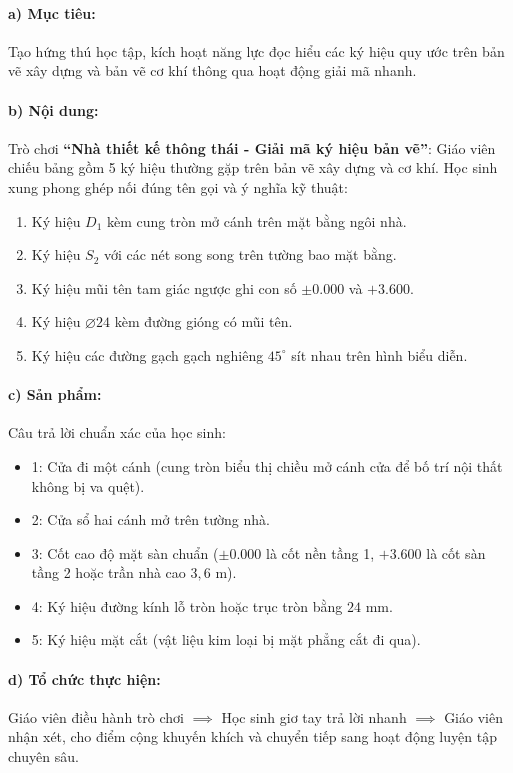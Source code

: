\documentclass[12pt, a4paper]{article}
\begin{document}
\paragraph{a) Mục tiêu:} Tạo hứng thú học tập, kích hoạt năng lực đọc hiểu các ký hiệu quy ước trên bản vẽ xây dựng và bản vẽ cơ khí thông qua hoạt động giải mã nhanh.

\paragraph{b) Nội dung:} Trò chơi \textbf{``Nhà thiết kế thông thái - Giải mã ký hiệu bản vẽ''}: Giáo viên chiếu bảng gồm 5 ký hiệu thường gặp trên bản vẽ xây dựng và cơ khí. Học sinh xung phong ghép nối đúng tên gọi và ý nghĩa kỹ thuật:
\begin{enumerate}[leftmargin=0.6cm]
    \item Ký hiệu $D_1$ kèm cung tròn mở cánh trên mặt bằng ngôi nhà.
    \item Ký hiệu $S_2$ với các nét song song trên tường bao mặt bằng.
    \item Ký hiệu mũi tên tam giác ngược ghi con số $\pm 0.000$ và $+3.600$.
    \item Ký hiệu $\varnothing 24$ kèm đường gióng có mũi tên.
    \item Ký hiệu các đường gạch gạch nghiêng $45^\circ$ sít nhau trên hình biểu diễn.
\end{enumerate}

\paragraph{c) Sản phẩm:} Câu trả lời chuẩn xác của học sinh:
\begin{itemize}[leftmargin=0.8cm]
    \item 1: Cửa đi một cánh (cung tròn biểu thị chiều mở cánh cửa để bố trí nội thất không bị va quệt).
    \item 2: Cửa sổ hai cánh mở trên tường nhà.
    \item 3: Cốt cao độ mặt sàn chuẩn ($\pm 0.000$ là cốt nền tầng 1, $+3.600$ là cốt sàn tầng 2 hoặc trần nhà cao $3{,}6\text{ m}$).
    \item 4: Ký hiệu đường kính lỗ tròn hoặc trục tròn bằng $24\text{ mm}$.
    \item 5: Ký hiệu mặt cắt (vật liệu kim loại bị mặt phẳng cắt đi qua).
\end{itemize}

\paragraph{d) Tổ chức thực hiện:} Giáo viên điều hành trò chơi $\implies$ Học sinh giơ tay trả lời nhanh $\implies$ Giáo viên nhận xét, cho điểm cộng khuyến khích và chuyển tiếp sang hoạt động luyện tập chuyên sâu.
\end{document}
